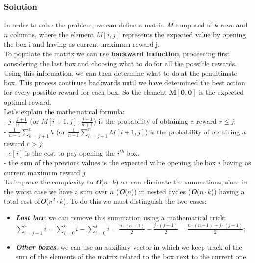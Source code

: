 \documentclass[11pt]{article}
\begin{document}
\subsubsection*{Solution}
In order to solve the problem, we can define a matrix \textit{M} composed of $k$ rows and $n$ columns, where the element $M[i, j]$ represents the expected value by opening the box i and having as current maximum reward j. \\
To populate the matrix we can use \textbf{backward induction}, proceeding first considering the last box and choosing what to do for all the possible rewards. Using this information, we can then determine what to do at the penultimate box. This process continues backwards until we have determined the best action for every possible reward for each box. So the element $\mathbf{M[0, 0]}$ is the expected optimal reward.\\
Let's explain the mathematical formula: \\
- $j \cdot \frac{j+1}{n+1}$ (or $M[i+1, j] \cdot \frac{j+1}{n+1}$) is the probability of obtaining a reward $r \le j$; \\
- $\frac{1}{n+1}\sum\limits_{h = j + 1}^n{h}$ (or $\frac{1}{n+1}\sum\limits_{h = j + 1}^n{M[i+1, j]}$) is the probability of obtaining a reward $r > j$; \\
- $c[i]$ is the cost to pay opening the $i^{th}$ box. \\
- the sum of the previous values is the expected value opening the box $i$ having as current maximum reward $j$ \\
To improve the complexity to \textbf{\textit{O}}($n \cdot k$) we can eliminate the summations, since in the worst case we have a sum over $n$ (\textbf{\textit{O}}($n$)) in nested cycles (\textbf{\textit{O}}($n \cdot k$)) having a total cost of\textbf{\textit{O}}($n^2 \cdot k$). To do this we must distinguish the two cases:
\begin{itemize}
	\item \textbf{\textit{Last box}}: we can remove this summation using a mathematical trick: \\
	$\sum\limits_{i = j + 1}^n{i} = \sum\limits_{i = 0}^n{i} - \sum\limits_{i = 0}^j{i} = \frac{n \cdot (n+1)}{2} - \frac{j \cdot (j+1)}{2} = \frac{n \cdot (n+1) - j \cdot (j+1)}{2}$;
	\item \textbf{\textit{Other boxes}}: we can use an auxiliary vector in which we keep track of the sum of the elements of the matrix related to the box next to the current one.
\end{itemize}
\end{document}
